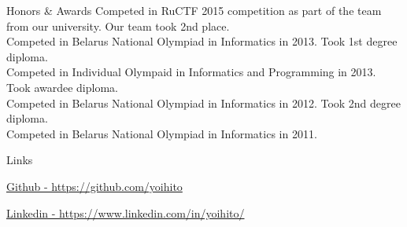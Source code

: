 \documentclass{resume}
\begin{document}
  \begin{rSection}{Honors \& Awards}
  {Competed in RuCTF 2015 competition as part of the team from our university. Our team took 2nd place.} \\
  {Competed in Belarus National Olympiad in Informatics in 2013. Took 1st degree diploma.} \\
  {Competed in Individual Olympaid in Informatics and Programming in 2013. Took awardee diploma.} \\
  {Competed in Belarus National Olympiad in Informatics in 2012. Took 2nd degree diploma.} \\
  {Competed in Belarus National Olympiad in Informatics in 2011.}
  \end{rSection}

  \begin{rSection}{Links}
  \item \href{https://github.com/yoihito}{Github - https://github.com/yoihito}
  \item \href{https://www.linkedin.com/in/yoihito/}{Linkedin - https://www.linkedin.com/in/yoihito/}
  \end{rSection}    
\end{document}
